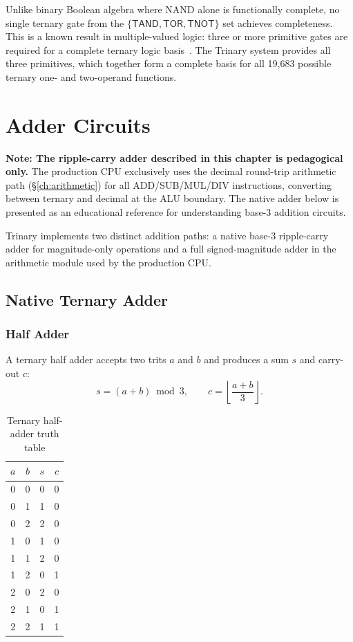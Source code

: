 \documentclass[12pt,a4paper,twoside]{book}
\theoremstyle{trinarytheorem}
\theoremstyle{trinarydefinition}
\newcommand{\code}[1]{\textsf{#1}}
\begin{document}
Unlike binary Boolean algebra where NAND alone is functionally complete,
no single ternary gate from the $\{\code{TAND}, \code{TOR}, \code{TNOT}\}$
set achieves completeness. This is a known result in multiple-valued logic:
three or more primitive gates are required for a complete ternary logic
basis~\cite{epstein1985mvl}. The Trinary system provides all three primitives,
which together form a complete basis for all 19,683 possible ternary
one- and two-operand functions.

\chapter{Adder Circuits}
\label{ch:adder}

\textbf{Note: The ripple-carry adder described in this chapter is pedagogical only.}
The production CPU exclusively uses the decimal round-trip arithmetic path (\S\ref{ch:arithmetic})
for all ADD/SUB/MUL/DIV instructions, converting between ternary and decimal at the ALU boundary.
The native adder below is presented as an educational reference for understanding base-3
addition circuits.

Trinary implements two distinct addition paths: a native base-3 ripple-carry adder
for magnitude-only operations and a full signed-magnitude adder in the arithmetic
module used by the production CPU.

\section{Native Ternary Adder}

\subsection{Half Adder}

A ternary half adder accepts two trits $a$ and $b$ and produces a sum $s$ and
carry-out $c$:
\[
s = (a + b) \bmod 3,\qquad c = \left\lfloor\frac{a + b}{3}\right\rfloor.
\]

\begin{table}[H]
\centering
\caption{Ternary half-adder truth table}
\label{tab:halfadder}
\begin{tabular}{cc|c|c}
$a$ & $b$ & $s$ & $c$ \\ \midrule
0 & 0 & 0 & 0 \\
0 & 1 & 1 & 0 \\
0 & 2 & 2 & 0 \\
1 & 0 & 1 & 0 \\
1 & 1 & 2 & 0 \\
1 & 2 & 0 & 1 \\
2 & 0 & 2 & 0 \\
2 & 1 & 0 & 1 \\
2 & 2 & 1 & 1 \\
\bottomrule
\end{tabular}
\end{table}
\end{document}
